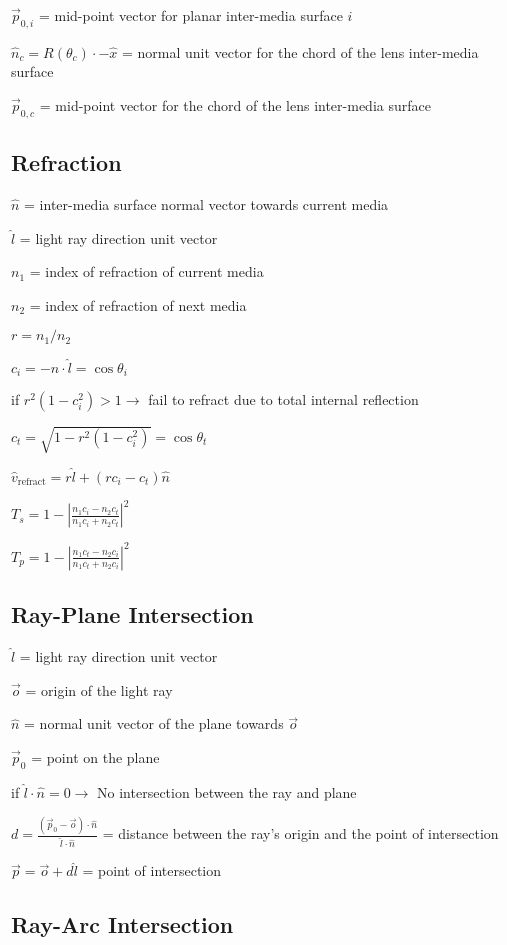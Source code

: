 \documentclass{article}
\begin{document}
$\vec{p}_{0, i}$ = mid-point vector for planar inter-media surface $i$

$\hat{n}_c = R(\theta_c) \cdot -\hat{x}$ = normal unit vector for the chord of the lens inter-media surface

$\vec{p}_{0, c}$ = mid-point vector for the chord of the lens inter-media surface


\subsection{Refraction}\label{subsec:refraction}
$\hat{n}$ = inter-media surface normal vector towards current media

$\hat{l}$ = light ray direction unit vector

$n_1$ = index of refraction of current media

$n_2$ = index of refraction of next media

$r = n_1 / n_2$

$c_i = -\hat{n} \cdot{} \hat{l} = \cos{\theta_i}$

if $r^2 (1 - c_i^2) > 1 \to$ fail to refract due to total internal reflection

$c_t = \sqrt{1 - r^2 (1 - c_i^2)} = \cos{\theta_t}$

$\hat{v}_{\text{refract}} = r \hat{l} + (r c_i - c_t) \hat{n}$

$T_{s} = 1 - | \frac{n_1 c_i - n_2 c_t}{n_1 c_i + n_2 c_t} |^2$

$T_{p} = 1 - | \frac{n_1 c_t - n_2 c_i}{n_1 c_t + n_2 c_i} |^2$

\subsection{Ray-Plane Intersection}\label{subsec:ray-plane-intersection}
$\hat{l}$ = light ray direction unit vector

$\vec{o}$ = origin of the light ray

$\hat{n}$ = normal unit vector of the plane towards $\vec{o}$

$\vec{p}_0$ = point on the plane

if $\hat{l} \cdot \hat{n} = 0 \to $ No intersection between the ray and plane

$d = \frac{(\vec{p}_0 - \vec{o}) \cdot \hat{n}}{\hat{l} \cdot \hat{n}}$ = distance between the ray's origin and the point of intersection

$\vec{p} = \vec{o} + d\hat{l}$ = point of intersection

\subsection{Ray-Arc Intersection}\label{subsec:ray-arc-intersection}
\end{document}
